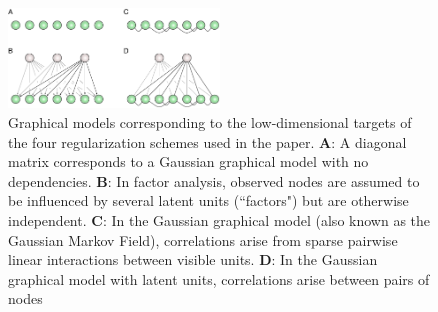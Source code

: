 \begin{figure}[htp]
\centering
\includegraphics[width=0.5\textwidth]{figures/Figure2.pdf}
\caption{
Graphical models corresponding to the low-dimensional targets of the four regularization schemes used in the paper.
\textbf{A}: A diagonal matrix corresponds to a Gaussian graphical model with no dependencies.
\textbf{B}: In factor analysis, observed nodes are assumed to be influenced by several latent units (``factors") but are otherwise independent.
\textbf{C}: In the Gaussian graphical model (also known as the Gaussian Markov Field), correlations arise from sparse pairwise linear interactions between visible units.
\textbf{D}: In the Gaussian graphical model with latent units, correlations arise  between pairs of nodes
}\label{fig:02}
\end{figure}
